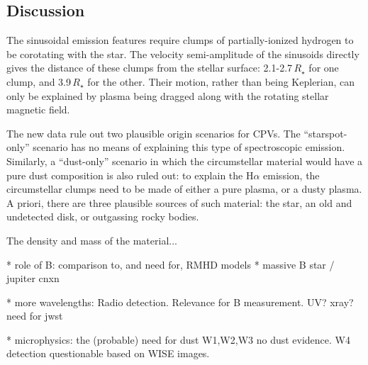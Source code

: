 \documentclass{nature3}
\begin{document}
\subsection{Discussion}

The sinusoidal emission features require clumps of partially-ionized
hydrogen to be corotating with the star.
The velocity semi-amplitude of the sinusoids directly gives the
distance of these clumps from the stellar surface: 2.1-2.7\,$R_\star$
for one clump, and 3.9\,$R_\star$ for the other.
Their motion, rather than being Keplerian, can only be explained by
plasma being dragged along with the rotating stellar magnetic field.

The new data rule out two plausible origin scenarios for CPVs.
The ``starspot-only'' scenario \cite{Koen2021} has no means of
explaining this type of spectroscopic emission.
Similarly, a ``dust-only'' scenario in which the circumstellar
material would have a pure dust composition is also ruled out:
to explain the H$\alpha$ emission, the circumstellar clumps need to be
made of either a pure plasma, or a dusty plasma.
A priori, there are three plausible sources of such material:
the star, an old and undetected disk, or outgassing rocky bodies.

The density and mass of the material...

* role of B: comparison to, and need for, RMHD models
  * massive B star / jupiter cnxn

* more wavelengths:
    Radio detection.   Relevance for B measurement.
    UV?  xray?
    need for jwst

* microphysics: the (probable) need for dust
    W1,W2,W3 no dust evidence.
    W4 detection questionable based on WISE images.




\end{document}
